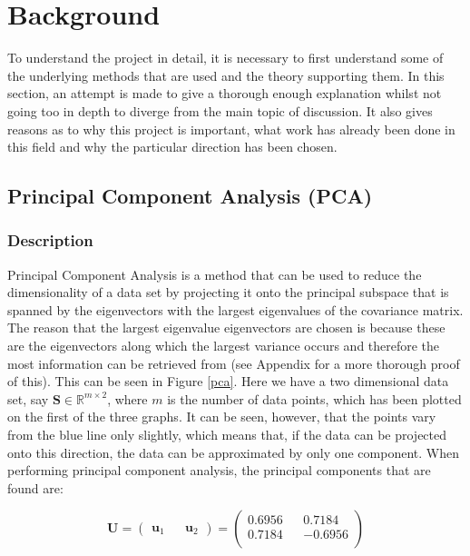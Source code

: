 \documentclass[11pt,a4paper]{article}
\begin{document}
\section{Background}
To understand the project in detail, it is necessary to first understand some of the underlying methods that are used and the theory supporting them. In this section, an attempt is made to give a thorough enough explanation whilst not going too in depth to diverge from the main topic of discussion. It also gives reasons as to why this project is important, what work has already been done in this field and why the particular direction has been chosen. 




\subsection{Principal Component Analysis (PCA)}
\subsubsection{Description}
Principal Component Analysis is a method that can be used to reduce the dimensionality of a data set by projecting it onto the principal subspace that is spanned by the eigenvectors with the largest eigenvalues of the covariance matrix. The reason that the largest eigenvalue eigenvectors are chosen is because these are the eigenvectors along which the largest variance occurs and therefore the most information can be retrieved from (see Appendix for a more thorough proof of this). This can be seen in Figure \ref{pca}. Here we have a two dimensional data set, say $\mathbf{S} \in \mathbb{R}^{m \times 2}$, where $m$ is the number of data points, which has been plotted on the first of the three graphs. It can be seen, however, that the points vary from the blue line only slightly, which means that, if the data can be projected onto this direction, the data can be approximated by only one component. When performing principal component analysis, the principal components that are found are:

\begin{equation*}
\mathbf{U} = 
\begin{pmatrix}
\mathbf{u}_1 && \mathbf{u}_2
\end{pmatrix} = 
\begin{pmatrix}
0.6956 && 0.7184\\
 0.7184 && -0.6956\\

\end{pmatrix}
\end{equation*}
\end{document}
